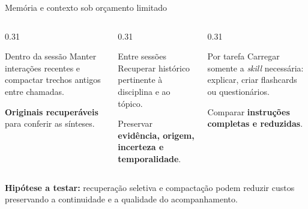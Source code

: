 \documentclass[aspectratio=169,11pt]{beamer}
\begin{document}
\begin{frame}{Memória e contexto sob orçamento limitado}
  \begin{columns}[T,onlytextwidth]
    \begin{column}{0.31\textwidth}
      \begin{block}{Dentro da sessão}
        Manter interações recentes e compactar trechos antigos entre chamadas.
        \par\medskip
        \textbf{Originais recuperáveis} para conferir as sínteses.
      \end{block}
    \end{column}
    \begin{column}{0.31\textwidth}
      \begin{block}{Entre sessões}
        Recuperar histórico pertinente à disciplina e ao tópico.
        \par\medskip
        Preservar \textbf{evidência, origem, incerteza e temporalidade}.
      \end{block}
    \end{column}
    \begin{column}{0.31\textwidth}
      \begin{block}{Por tarefa}
        Carregar somente a \textit{skill} necessária: explicar, criar flashcards ou questionários.
        \par\medskip
        Comparar \textbf{instruções completas e reduzidas}.
      \end{block}
    \end{column}
  \end{columns}
  \vspace{4mm}
  \textbf{Hipótese a testar:} recuperação seletiva e compactação podem reduzir
  custos preservando a continuidade e a qualidade do acompanhamento.
\end{frame}
\end{document}
